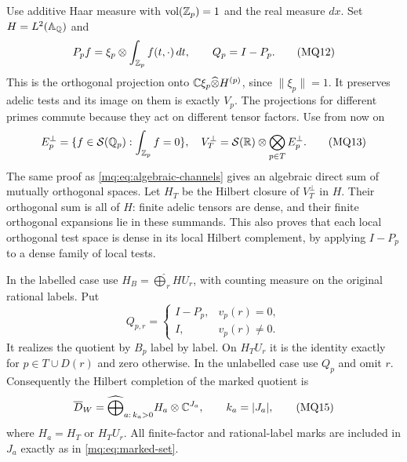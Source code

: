 Use additive Haar measure with $\operatorname{vol}(\mathbb Z_p)=1$ and
the real measure $dx$. Set $H=L^2(\mathbb A_\mathbb Q)$ and
\[
 P_pf=\xi_p\otimes\int_{\mathbb Z_p}f(t,\cdot)\,dt,
 \qquad Q_p=I-P_p.
 \tag{MQ12}\label{mq:eq:orthogonal-projection}
\]
This is the orthogonal projection onto
$\mathbb C\xi_p\widehat\otimes H^{(p)}$, since $\|\xi_p\|=1$.
It preserves adelic tests and its image on them is exactly $V_p$.
The projections for different primes commute because they act on
different tensor factors. Use from now on
\[
 E_p^\perp=\{f\in\mathcal S(\mathbb Q_p):\int_{\mathbb Z_p}f=0\},
 \quad V_T^\perp=\mathcal S(\mathbb R)\otimes
                  \bigotimes_{p\in T}E_p^\perp.
 \tag{MQ13}\label{mq:eq:orthogonal-channels}
\]
The same proof as \eqref{mq:eq:algebraic-channels} gives an algebraic
direct sum of mutually orthogonal spaces. Let $H_T$ be the Hilbert
closure of $V_T^\perp$ in $H$. Their orthogonal sum is all of $H$:
finite adelic tensors are dense, and their finite orthogonal
expansions lie in these summands. This also proves that each local
orthogonal test space is dense in its local Hilbert complement,
by applying $I-P_p$ to a dense family of local tests.

In the labelled case use
$H_B=\widehat\bigoplus_r HU_r$, with counting measure on the
original rational labels. Put
\[
 Q_{p,r}=\begin{cases}I-P_p,&v_p(r)=0,\\I,&v_p(r)\ne0.
 \end{cases}
 \tag{MQ14}\label{mq:eq:labelled-projection}
\]
It realizes the quotient by $B_p$ label by label. On $H_TU_r$
it is the identity exactly for $p\in T\cup D(r)$ and zero
otherwise. In the unlabelled case use $Q_p$ and omit $r$.
Consequently the Hilbert completion of the marked quotient is
\[
 \overline D_W=
 \widehat\bigoplus_{a:\,k_a>0} H_a\otimes\mathbb C^{J_a},
 \qquad k_a=|J_a|,
 \tag{MQ15}\label{mq:eq:marked-hilbert}
\]
where $H_a=H_T$ or $H_TU_r$. All finite-factor and rational-label
marks are included in $J_a$ exactly as in \eqref{mq:eq:marked-set}.


